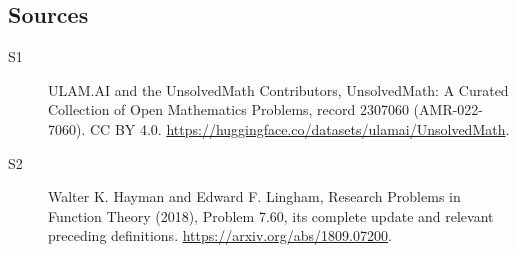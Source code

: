 \documentclass[11pt]{article}
\begin{document}
\subsection{Sources}
\begin{description}
\item[\hypertarget{source:2307060:1}{S1}] ULAM.AI and the UnsolvedMath Contributors, UnsolvedMath: A Curated Collection of Open Mathematics Problems, record 2307060 (AMR-022-7060). CC BY 4.0. \url{https://huggingface.co/datasets/ulamai/UnsolvedMath}.
\item[\hypertarget{source:2307060:2}{S2}] Walter K. Hayman and Edward F. Lingham, Research Problems in Function Theory (2018), Problem 7.60, its complete update and relevant preceding definitions. \url{https://arxiv.org/abs/1809.07200}.
\end{description}
\label{end:2307060}
\end{document}
